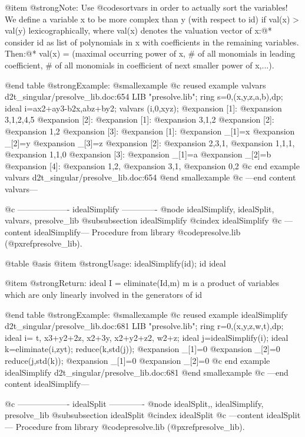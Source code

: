@item @strong{Note:}
Use @code{sortvars} in order to actually sort the variables!
We define a variable x to be more complex than y (with respect to id)
if val(x) > val(y) lexicographically, where val(x) denotes the
valuation vector of x:@*
consider id as list of polynomials in x with coefficients in the
remaining variables. Then:@*
val(x) = (maximal occurring power of x, # of all monomials in leading
coefficient, # of all monomials in coefficient of next smaller power
of x,...).

@end table
@strong{Example:}
@smallexample
@c reused example valvars d2t_singular/presolve_lib.doc:654 
LIB "presolve.lib";
ring s=0,(x,y,z,a,b),dp;
ideal i=ax2+ay3-b2x,abz+by2;
valvars (i,0,xyz);
@expansion{} [1]:
@expansion{}    3,1,2,4,5
@expansion{} [2]:
@expansion{}    [1]:
@expansion{}       3,1,2
@expansion{}    [2]:
@expansion{}       1,2
@expansion{} [3]:
@expansion{}    [1]:
@expansion{}       _[1]=x
@expansion{}       _[2]=y
@expansion{}       _[3]=z
@expansion{}    [2]:
@expansion{}       2,3,1,
@expansion{}       1,1,1,
@expansion{}       1,1,0 
@expansion{}    [3]:
@expansion{}       _[1]=a
@expansion{}       _[2]=b
@expansion{}    [4]:
@expansion{}       1,2,
@expansion{}       3,1,
@expansion{}       0,2 
@c end example valvars d2t_singular/presolve_lib.doc:654
@end smallexample
@c ---end content valvars---

@c ------------------- idealSimplify -------------
@node idealSimplify, idealSplit, valvars, presolve_lib
@subsubsection idealSimplify
@cindex idealSimplify
@c ---content idealSimplify---
Procedure from library @code{presolve.lib} (@pxref{presolve_lib}).

@table @asis
@item @strong{Usage:}
idealSimplify(id); id ideal

@item @strong{Return:}
ideal I = eliminate(Id,m) m is a product of variables
which are only linearly involved in the generators of id

@end table
@strong{Example:}
@smallexample
@c reused example idealSimplify d2t_singular/presolve_lib.doc:681 
LIB "presolve.lib";
ring r=0,(x,y,z,w,t),dp;
ideal i=
t,
x3+y2+2z,
x2+3y,
x2+y2+z2,
w2+z;
ideal j=idealSimplify(i);
ideal k=eliminate(i,zyt);
reduce(k,std(j));
@expansion{} _[1]=0
@expansion{} _[2]=0
reduce(j,std(k));
@expansion{} _[1]=0
@expansion{} _[2]=0
@c end example idealSimplify d2t_singular/presolve_lib.doc:681
@end smallexample
@c ---end content idealSimplify---

@c ------------------- idealSplit -------------
@node idealSplit,, idealSimplify, presolve_lib
@subsubsection idealSplit
@cindex idealSplit
@c ---content idealSplit---
Procedure from library @code{presolve.lib} (@pxref{presolve_lib}).

